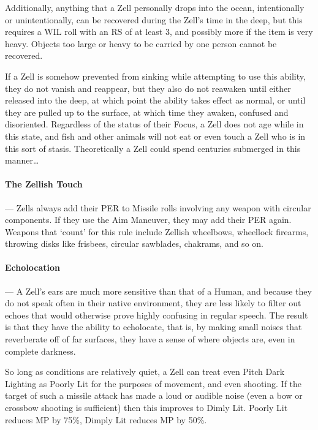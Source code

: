 \documentclass[oneside,11pt,english]{book}
\begin{document}
Additionally, anything that a Zell personally drops into the ocean, intentionally or 
unintentionally, can be recovered during the Zell's time in the deep, but this requires a WIL roll 
with an RS of at least 3, and possibly more if the item is very heavy. Objects too large or heavy to 
be carried by one person cannot be recovered. 

If a Zell is somehow prevented from sinking while attempting to use this ability, they do not 
vanish and reappear, but they also do not reawaken until either released into the deep, at which 
point the ability takes effect as normal, or until they are pulled up to the surface, at which time 
they awaken, confused and disoriented. Regardless of the status of their Focus, a Zell does not 
age while in this state, and fish and other animals will not eat or even touch a Zell who is in this 
sort of stasis. Theoretically a Zell could spend centuries submerged in this manner… 

\paragraph{The Zellish Touch}---\quad
Zells always add their PER to Missile rolls involving any weapon with circular components. If 
they use the Aim Maneuver, they may add their PER again. Weapons that ‘count’ for this rule 
include Zellish wheelbows, wheellock firearms, throwing disks like frisbees, circular sawblades, 
chakrams, and so on. 

\paragraph{Echolocation}---\quad
A Zell's ears are much more sensitive than that of a Human, and because they do not speak often 
in their native environment, they are less likely to filter out echoes that would otherwise prove 
highly confusing in regular speech. The result is that they have the ability to echolocate, that is, 
by making small noises that reverberate off of far surfaces, they have a sense of where objects 
are, even in complete darkness. 

So long as conditions are relatively quiet, a Zell can treat even Pitch Dark Lighting as Poorly Lit 
for the purposes of movement, and even shooting. If the target of such a missile attack has made a 
loud or audible noise (even a bow or crossbow shooting is sufficient) then this improves to Dimly 
Lit. Poorly Lit reduces MP by 75\%, Dimply Lit reduces MP by 50\%. 
\end{document}
